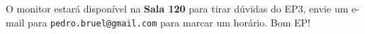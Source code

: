 \documentclass[final,12pt,a4paper]{elsarticle}
\begin{document}
O monitor estará disponível na \textbf{Sala 120} para tirar dúvidas do EP3,
envie um e-mail para \texttt{pedro.bruel@gmail.com} para marcar um horário.
Bom EP!









\end{document}

